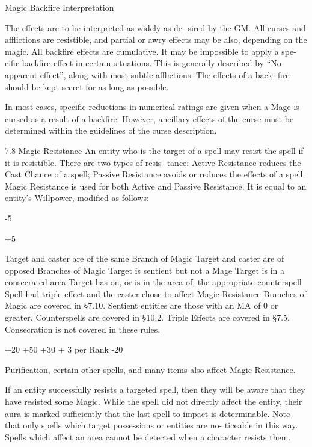 \begin{Chapter}{Magic}
Backfire Interpretation 

The  effects  are  to  be  interpreted  as  widely  as  de-
sired  by  the  GM.  All  curses  and  afflictions  are 
resistible,  and partial  or  awry  effects  may  be  also, 
depending  on  the  magic.  All  backfire  effects  are 
cumulative.  It  may  be  impossible  to  apply  a  spe-
cific  backfire  effect  in  certain  situations.  This  is 
generally described by “No apparent effect”, along 
with most subtle afflictions. The effects of a back-
fire should be kept secret for as long as possible. 

In  most  cases,  specific  reductions  in  numerical 
ratings are given when a Mage is cursed as a result 
of  a  backfire.  However,  ancillary  effects  of  the 
curse  must be  determined  within  the  guidelines  of 
the curse description. 

7.8 Magic Resistance 
An entity who is the target of a spell may resist the 
spell if it is resistible. There are two types of resis-
tance:  Active  Resistance  reduces  the  Cast  Chance 
of a spell; Passive Resistance avoids or reduces the 
effects of a spell. Magic Resistance is used for both 
Active  and  Passive  Resistance.  It  is  equal  to  an 
entity’s Willpower, modified as follows: 

-5 

+5 

Target and caster are of the same 
Branch of Magic 
Target and caster are of opposed 
Branches of Magic 
Target is sentient but not a Mage 
Target is in a consecrated area 
Target has on, or is in the area of, the 
appropriate counterspell 
Spell had triple effect and the caster 
chose to affect Magic Resistance 
Branches  of  Magic  are  covered  in  §7.10.  Sentient 
entities  are  those  with  an  MA  of  0  or  greater. 
Counterspells  are  covered  in  §10.2.  Triple  Effects 
are covered in §7.5. Consecration is not covered in 
these rules. 

+20 
+50 
+30 + 3 
per Rank 
-20 

Purification,  certain  other  spells,  and  many  items 
also affect Magic Resistance. 

If  an  entity  successfully  resists  a  targeted  spell, 
then  they  will  be  aware  that  they  have  resisted 
some Magic. While the spell did not directly affect 
the entity, their aura is marked sufficiently that the 
last spell to impact is determinable. Note that only 
spells  which  target  possessions  or  entities  are  no-
ticeable  in  this  way.  Spells  which  affect  an  area 
cannot be detected when a character resists them. 


\end{Chapter}
